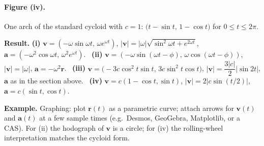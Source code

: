 \documentclass[11pt]{article}
\newcommand{\resultbox}[1]{%
  \begin{savenotes}%
  \begingroup\setlength{\fboxsep}{10pt}\noindent
  \colorbox{purple!8}{\parbox{\dimexpr\linewidth-2\fboxsep\relax}{\textbf{Result. }#1}}
  \endgroup
  \end{savenotes}%
}
\newcommand{\examplebox}[1]{%
  \begin{savenotes}%
  \begingroup\setlength{\fboxsep}{10pt}\noindent
  \colorbox{green!8}{\parbox{\dimexpr\linewidth-2\fboxsep\relax}{\textbf{Example. }#1}}
  \endgroup
  \end{savenotes}%
}
\begin{document}
\paragraph{Figure (iv).}
One arch of the standard cycloid with \(c=1\): \(\bigl(t-\sin t,\,1-\cos t\bigr)\) for
\(0\le t\le 2\pi\).

\begin{center}
\end{center}

\resultbox{\textbf{(i)} \(\mathbf{v}=(-\omega\sin\omega t,\,\omega e^{\omega t})\),
\(|\mathbf{v}|=|\omega|\sqrt{\sin^2\omega t+e^{2\omega t}}\),
\(\mathbf{a}=(-\omega^2\cos\omega t,\,\omega^2 e^{\omega t})\).
\ \textbf{(ii)} \(\mathbf{v}=(-\omega\sin(\omega t-\phi),\,\omega\cos(\omega t-\phi))\),
\(|\mathbf{v}|=|\omega|\), \(\mathbf{a}=-\omega^2\mathbf{r}\).
\ \textbf{(iii)} \(\mathbf{v}=\bigl(-3c\cos^2 t\sin t,\,3c\sin^2 t\cos t\bigr)\),
\(|\mathbf{v}|=\dfrac{3|c|}{2}|\sin 2t|\), \(\mathbf{a}\) as in the section above.
\ \textbf{(iv)} \(\mathbf{v}=c(1-\cos t,\sin t)\), \(|\mathbf{v}|=2|c\sin(t/2)|\),
\(\mathbf{a}=c(\sin t,\cos t)\).}

\examplebox{Graphing: plot \(\mathbf{r}(t)\) as a parametric curve; attach arrows for
\(\mathbf{v}(t)\) and \(\mathbf{a}(t)\) at a few sample times (e.g.\ Desmos,
GeoGebra, Matplotlib, or a CAS). For (ii) the hodograph of \(\mathbf{v}\) is a
circle; for (iv) the rolling-wheel interpretation matches the cycloid form.}
\end{document}

